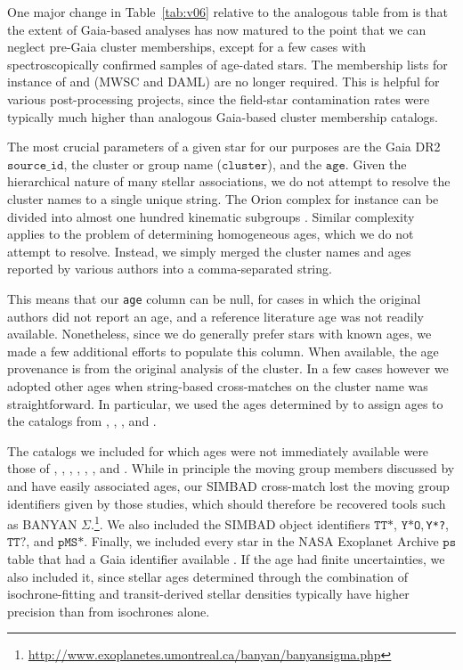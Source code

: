 \documentclass[12pt,modern,twocolumn,tighten]{aastex63}
\begin{document}
One major change in Table~\ref{tab:v06} relative to the analogous
table from \citet{bouma_cdipsI_2019} is that the extent of Gaia-based
analyses has now matured to the point that we can neglect pre-Gaia
cluster memberships, except for a few cases with spectroscopically
confirmed samples of age-dated stars.  The membership lists for
instance of \citet{Kharchenko_et_al_2013} and \citet{dias_proper_2014}
(MWSC and DAML) are no longer required.  This is helpful for various
post-processing projects,  since the field-star contamination rates
were typically much higher than analogous Gaia-based cluster membership
catalogs.

The most crucial parameters of a given star for our purposes are the
Gaia DR2 $\texttt{source\_id}$, the cluster or
group name ($\texttt{cluster}$), and the $\texttt{age}$.  Given the
hierarchical nature of many stellar associations, we do not attempt to
resolve the cluster names to a single unique string.  The Orion
complex for instance can be divided into almost one hundred kinematic
subgroups \citep{kounkel_apogee2_2018}.  Similar complexity applies to
the problem of determining homogeneous ages, which we do not attempt
to resolve.  Instead, we simply merged the cluster names and ages
reported by various authors into a comma-separated string.

This means that our \texttt{age} column can be null, for cases in
which the original authors did not report an age, and a reference
literature age was not readily available.  Nonetheless, since we do
generally prefer stars with known ages, we made a few additional
efforts to populate this column.  When available, the age provenance
is from the original analysis of the cluster.  In a few cases
however we adopted other ages when string-based cross-matches on the
cluster name was straightforward.  In particular, we used the ages
determined by \citet{CantatGaudin2020b} to assign ages to the catalogs
from \citet{GaiaCollaboration2018}, \citet{CantatGaudin2018a},
\citet{CastroGinard2020}, and \citet{CantatGaudin2020a}.

The catalogs we included for which ages were not immediately available
were those of \citet{CottenSong2016}, \citet{Oh2017},
\citet{Zari2018}, \citet{Gagne2018b},
\citet{Gagne2018a}, \citet{Gagne2018c}, and \citet{Ujjwal2020}.  While
in principle the moving group members discussed by
\citet{Gagne2018b,Gagne2018a,Gagne2018c} and \citet{Ujjwal2020} have
easily associated ages, our SIMBAD cross-match lost the moving group
identifiers given by those studies, which should therefore be recovered
tools such as BANYAN
$\Sigma$.\footnote{\url{http://www.exoplanetes.umontreal.ca/banyan/banyansigma.php}}.
We also included the SIMBAD object identifiers $\texttt{TT*}$,
$\texttt{Y*O}, $\texttt{Y*?}, $\texttt{TT?}$, and $\texttt{pMS*}$.
Finally, we  included every star in the NASA Exoplanet Archive
$\texttt{ps}$ table that had a Gaia identifier available
\citep{NASAExoArchive_ps_20210506}.  If the age had finite
uncertainties, we also included it, since stellar ages determined
through the combination of isochrone-fitting and transit-derived
stellar densities typically have higher precision than from isochrones
alone.
\end{document}
